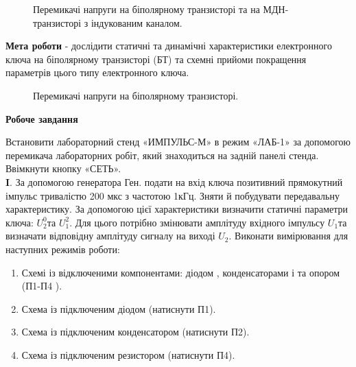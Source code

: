 \documentclass[a4paper,14pt]{extreport}
\begin{document}
\begin{figure}[h]
	\caption{Перемикачі напруги на біполярному транзисторі та на МДН-транзисторі з індукованим каналом.}
	\label{ris1}
\end{figure}

\textbf{Мета роботи} - дослідити статичні та динамічні характеристики
електронного ключа на біполярному транзисторі (БТ) та схемні прийоми
покращення параметрів цього типу електронного ключа.

\begin{figure}[h]
	\caption{Перемикачі напруги на біполярному транзисторі.}
	\label{ris2}
\end{figure}


\begin{center}
\textbf{Робоче завдання}
\end{center}
Встановити лабораторний стенд «ИМПУЛЬС-М» в режим «ЛАБ-1» за допомогою перемикача лабораторних робіт, який знаходиться на задній панелі стенда. 
Ввімкнути кнопку «СЕТЬ».\\

\textbf{I}. За допомогою генератора Ген. подати на вхід ключа позитивний прямокутний імпульс тривалістю 200 мкс з частотою 1кГц. 
Зняти й побудувати передавальну характеристику. За допомогою цієї характеристики визначити статичні параметри ключа: $U_2^0$та $U_1^2$. Для цього потрібно змінювати амплітуду вхідного імпульсу $U_1$та визначати відповідну амплітуду сигналу на виході $U_2$. 
Виконати вимірювання для наступних режимів роботи:
\begin{enumerate}
	\item Схемі із відключеними компонентами: діодом , конденсаторами  і  та опором  (П1-П4 ). 
    \item Схема із підключеним діодом  (натиснути П1).
    \item Схема із підключеним конденсатором  (натиснути П2).
    \item Схема із підключеним резистором  (натиснути П4).
\end{enumerate}
 
\end{document}
